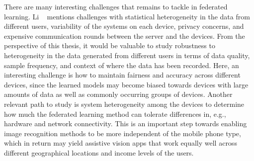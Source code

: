 There are many interesting challenges that remains to tackle in federated learning. 
Li \etal~\cite{li2020federated} mentions challenges with statistical heterogeneity in the data from different users, variability of the systems on each device, privacy concerns, and expensive communication rounds between the server and the devices. 
From the perspective of this thesis, it would be valuable to study robustness to heterogeneity in the data generated from different users in terms of data quality, sample frequency, and context of where the data has been recorded. 
Here, an interesting challenge is how to maintain fairness and accuracy across different devices, since the learned models may become biased towards devices with large amounts of data as well as commonly occurring groups of devices. 
Another relevant path to study is system heterogeneity among the devices to determine how much the federated learning method can tolerate differences in, e.g., hardware and network connectivity. This is an important step towards enabling image recognition methods to be more independent of the mobile phone type, which in return may yield assistive vision apps that work equally well across different geographical locations and income levels of the users. 



